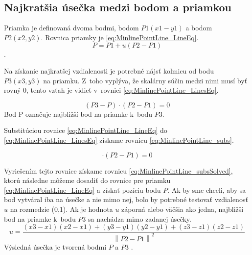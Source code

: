 \subsection*{Najkratšia úsečka medzi bodom a priamkou}\label{sec:najkratsiauseckaBP}
Priamka je definovaná dvoma bodmi, bodom $P1(x1-y1)$ a bodom $P2(x2,y2)$. 
Rovnica priamky je \ref{eq:MinlinePointLine_LineEq}.
\begin{equation}
    P = P1 + u(P2-P1)
    \label{eq:MinlinePointLine_LineEq}
\end{equation}. 

Na získanie najkratšej vzdialenosti je potrebné nájsť kolmicu od bodu $P3(x3,y3)$ na priamku. Z~toho vyplýva, že skalárny súčin medzi nimi musí byť rovný 0, tento vzťah je vidieť v~rovnici \ref{eq:MinlinePointLine_LinesEq}.

\begin{equation}
    (P3-P)\cdot(P2-P1) =0 
    \label{eq:MinlinePointLine_LinesEq}
\end{equation}
Bod P označuje najbližší bod na priamke k~bodu $P3$.

Substitúciou rovnice \ref{eq:MinlinePointLine_LineEq} do \ref{eq:MinlinePointLine_LinesEq} získame rovnicu \ref{eq:MinlinePointLine_subs}.

\begin{equation}
[P3 - P1 - u(P2-P1)] \cdot (P2 - P1) = 0
    \label{eq:MinlinePointLine_subs}
\end{equation}

Vyriešením tejto rovnice získame rovnicu \ref{eq:MinlinePointLine_subsSolved}, ktorú následne môžeme dosadiť do rovnice pre priamku \ref{eq:MinlinePointLine_LineEq} a získať pozíciu bodu $P$. Ak by sme chceli, aby sa bod vytváral iba na úsečke a nie mimo nej, bolo by potrebné testovať vzdialenosť $u$ na rozmedzie (0,1). Ak je hodnota $u$ záporná alebo väčšia ako jedna,  najbližší bod na priamke k~bodu $P3$ sa nachádza mimo zadanej úsečky. 
\begin{equation}
u= \frac
{\left (x3 -x1  \right )\left (x2-x1  \right )
+\left (y3-y1  \right )\left (y2-y1  \right )
+\left (z3-z1  \right )\left (z2-z1  \right )}
{\left \| P2-P1 \right \|^{2}}
    \label{eq:MinlinePointLine_subsSolved}
\end{equation}
Výsledná úsečka je tvorená bodmi $P$ a $P3$ \cite{bourke_Point_Line_Plane}.



